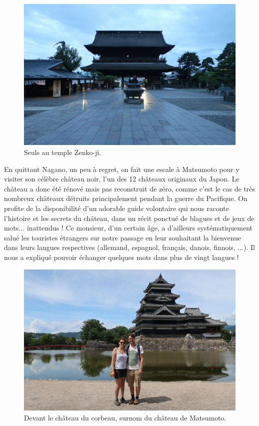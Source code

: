 \begin{figure}
\centering
\includegraphics{images/20180723_zenko.JPG}
\caption{Seuls au temple Zenko-ji.}
\end{figure}

En quittant Nagano, un peu à regret, on fait une escale à Matsumoto pour
y visiter son célèbre château noir, l'un des 12 châteaux originaux du
Japon. Le château a donc été rénové mais pas reconstruit de zéro, comme
c'est le cas de très nombreux châteaux détruits principalement pendant
la guerre du Pacifique. On profite de la disponibilité d'un adorable
guide volontaire qui nous raconte l'histoire et les secrets du château,
dans un récit ponctué de blagues et de jeux de mots... inattendus ! Ce
monsieur, d'un certain âge, a d'ailleurs systématiquement salué les
touristes étrangers sur notre passage en leur souhaitant la bienvenue
dans leurs langues respectives (allemand, espagnol, français, danois,
finnois, ...). Il nous a expliqué pouvoir échanger quelques mots dans
plus de vingt langues !

\begin{figure}
\centering
\includegraphics{images/20180723_matsumoto.JPG}
\caption{Devant le château du corbeau, surnom du château de Matsumoto.}
\end{figure}

